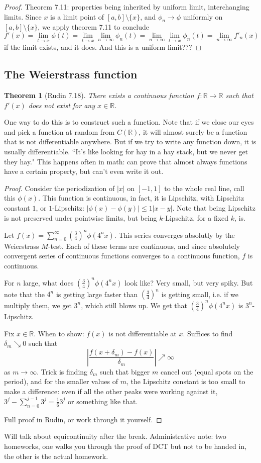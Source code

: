 \documentclass{article}
\theoremstyle{plain}
\newtheorem{theorem}{Theorem}
\theoremstyle{remark}
\newcommand{\R}{{\mathbb R}}
\begin{document}
\begin{proof}
	Theorem 7.11: properties being inherited by uniform limit,
	interchanging limits.
	Since $x$ is a limit point of $[a,b] \setminus \{x\}$,
	and $\phi_n \to \phi$ uniformly on $[a,b] \setminus \{x\}$,
	we apply theorem 7.11 to conclude
	\[
		f'(x) = \lim_{t \to x} \phi(t) =
		\lim_{t \to x} \lim_{n\to\infty} \phi_n(t)
		= \lim_{n\to\infty} \lim_{t \to x} \phi_n(t) = \lim_{n\to\infty} f'_n(x)
	\]
	if the limit exists, and it does.
	And this is a uniform limit???
\end{proof}

\subsection{The Weierstrass function}
\begin{theorem}[Rudin 7.18]
	There exists a continuous function $f \colon \R \to \R$ such that
	$f'(x)$ does not exist for any $x \in \R$.
\end{theorem}
One way to do this is to construct such a function.
Note that if we close our eyes and pick a function at random from $C(\R)$,
it will almost surely be a function that is not differentiable anywhere.
But if we try to write any function down, it is usually differentiable.
``It's like looking for hay in a hay stack, but we never get they hay."
This happens often in math: can prove that almost always functions have a certain property,
but can't even write it out.
\begin{proof}
	Consider the periodization of $|x|$ on $[-1,1]$ to the whole real line,
	call this $\phi(x)$.
	This function is continuous, in fact, it is Lipschitz,
	with Lipschitz constant $1$, or $1$-Lipschitz:
	$\lvert \phi(x) - \phi(y) \rvert \leq 1\lvert x-y \rvert$.
	Note that being Lipschitz is not preserved under pointwise limits,
	but being $k$-Lipschitz, for a fixed $k$, is.

	Let $f(x) = \sum_{n = 0}^\infty \left(\frac{3}{4}\right)^n \phi(4^n x)$.
	This series converges absolutly by the Weierstrass $M$-test.
	Each of these terms are continuous,
	and since absolutely convergent series of continuous functions
	converges to a continuous function, $f$ is continuous.

	For $n$ large, what does $\left(\frac{3}{4}\right)^n \phi(4^n x)$ look like?
	Very small, but very spiky.
	But note that the $4^n$ is getting large faster than
	$\left(\frac{3}{4}\right)^n$ is getting small,
	i.e. if we multiply them, we get $3^n$, which still blows up.
	We get that $\left(\frac{3}{4}\right)^n \phi(4^n x)$ is $3^n$-Lipschitz.
	
	Fix $x \in \R$.
	When to show: $f(x)$ is not differentiable at $x$.
	Suffices to find $\delta_m \searrow 0$ such that
	\[
		\left\lvert \frac{f(x + \delta_m) - f(x)}{\delta_m}\right\rvert \nearrow \infty
	\]
	as $m \to \infty$.
	Trick is finding $\delta_m$ such that
	bigger $m$ cancel out (equal spots on the period),
	and for the smaller values of $m$, the Lipschitz constant is too small
	to make a difference: even if all the other peaks were working against it,
	$3^j - \sum_{n=0}^{j-1} 3^j = \frac{1}{6}3^j$ or something like that.

	Full proof in Rudin, or work through it yourself.
\end{proof}

Will talk about equicontinuity after the break.
Administrative note: two homeworks,
one walks you through the proof of DCT but not to be handed in,
the other is the actual homework.
\end{document}
